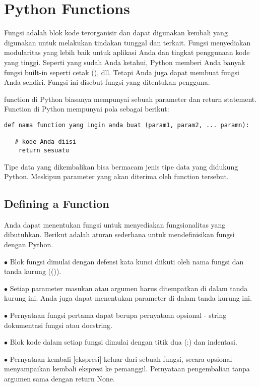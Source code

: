 \section{Python Functions}\par
Fungsi adalah blok kode terorganisir dan dapat digunakan kembali yang digunakan untuk melakukan tindakan tunggal dan terkait. Fungsi menyediakan modularitas yang lebih baik untuk aplikasi Anda dan tingkat penggunaan kode yang tinggi. Seperti yang sudah Anda ketahui, Python memberi Anda banyak fungsi built-in seperti cetak (), dll. Tetapi Anda juga dapat membuat fungsi Anda sendiri. Fungsi ini disebut fungsi yang ditentukan pengguna. \par

function di Python biasanya mempunyai sebuah parameter dan return statement. Function di Python mempunyai pola sebagai berikut:
\begin{verbatim}
def nama function yang ingin anda buat (param1, param2, ... paramn):
   
   # kode Anda diisi
    return sesuatu
\end{verbatim}    
Tipe data yang dikembalikan bisa bermacam jenis tipe data yang didukung Python. Meskipun parameter yang akan diterima oleh function tersebut. 

\subsection{Defining a Function} \par
 Anda dapat menentukan fungsi untuk menyediakan fungsionalitas yang dibutuhkan. Berikut adalah aturan sederhana untuk mendefinisikan fungsi dengan Python. \par
\noindent 
 $ \bullet $ Blok fungsi dimulai dengan defensi kata kunci diikuti oleh nama fungsi dan tanda kurung (()). \par
\noindent 
 $ \bullet $ Setiap parameter masukan atau argumen harus ditempatkan di dalam tanda kurung ini. Anda juga dapat menentukan parameter di dalam tanda kurung ini. \par
\noindent 
 $ \bullet $ Pernyataan fungsi pertama dapat berupa pernyataan opsional - string dokumentasi fungsi atau docstring. \par
\noindent 
 $ \bullet $ Blok kode dalam setiap fungsi dimulai dengan titik dua (:) dan indentasi. \par
\noindent 
 $ \bullet $ Pernyataan kembali [ekspresi] keluar dari sebuah fungsi, secara opsional menyampaikan kembali ekspresi ke pemanggil. Pernyataan pengembalian tanpa argumen sama dengan return None. \par
\vspace{12pt}
\noindent 

